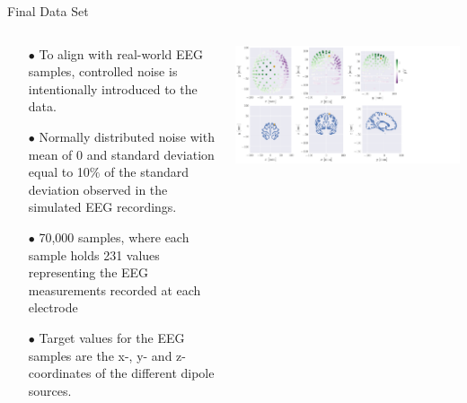 \documentclass[aspectratio=169, 9pt]{beamer}
\begin{document}
\begin{frame}{Final Data Set}
  \begin{columns}
    \begin{column}{0.5\textwidth}
      \begin{itemize}
        \item[$\bullet$] To align with real-world EEG samples, controlled noise is intentionally introduced to the data.
        \item[$\bullet$] Normally distributed noise with mean of 0 and standard deviation equal to 10$\%$ of the standard deviation observed in the simulated EEG recordings.
        \item[$\bullet$] 70,000 samples, where each sample holds 231 values representing the EEG measurements recorded at each electrode
        \item[$\bullet$] Target values for the EEG samples are the x-, y- and z-coordinates of the different dipole sources.
      \end{itemize}
    \end{column}
    \begin{column}{0.5\textwidth}
      \includegraphics[width=1.0\textwidth]{figures/simple_example.pdf}
    \end{column}
  \end{columns}
\end{frame}
\end{document}
